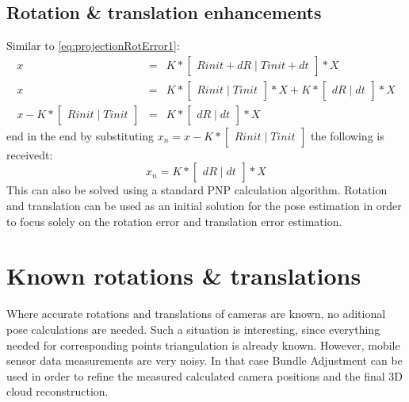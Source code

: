 \subsection{Rotation \& translation enhancements}
Similar to \ref{eq:projectionRotError1}:
\begin{equation} \label{eq:projectionRotError3}
\begin{array}{rcl}
 x & = & K * \begin{bmatrix}Rinit + dR\mid Tinit + dt\end{bmatrix} * X \\
 x & = & K * \begin{bmatrix}Rinit\mid Tinit\end{bmatrix} * X + K * \begin{bmatrix}dR\mid dt\end{bmatrix} * X \\
 x - K * \begin{bmatrix}Rinit\mid Tinit\end{bmatrix} & = & K * \begin{bmatrix}dR\mid dt\end{bmatrix} * X
\end{array}
\end{equation}
end in the end by substituting $x_{n} = x - K * \begin{bmatrix}Rinit\mid Tinit\end{bmatrix}$ the following is receivedt: 
\begin{equation} \label{eq:projectionRotError4}
x_{n} = K * \begin{bmatrix}dR\mid dt\end{bmatrix} * X
\end{equation}
This can also be solved using a standard PNP\cite{website:poseEstimation} calculation algorithm. Rotation and translation can be used as an initial solution for the pose estimation in order to focus solely on the rotation error and translation error estimation.
\section{Known rotations \& translations}
Where accurate rotations and translations of cameras are known, no aditional pose calculations are needed. Such a situation is interesting, since everything needed for corresponding points triangulation is already known. However, mobile sensor data  measurements are very noisy. In that case Bundle Adjustment can be used in order to refine the measured calculated camera positions and the final 3D cloud reconstruction.
